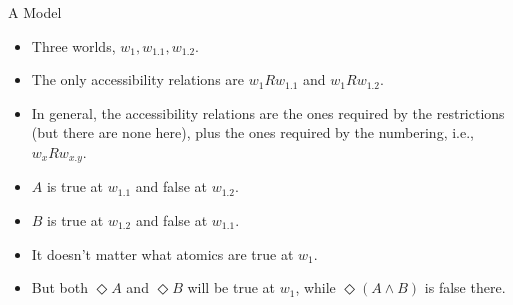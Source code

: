 \documentclass[
  ignorenonframetext,
]{beamer}
\providecommand{\tightlist}{%
  \setlength{\itemsep}{0pt}\setlength{\parskip}{0pt}}
\renewcommand{\,}{\text{, }}
\begin{document}
\begin{frame}{A Model}
\protect\hypertarget{a-model-1}{}

\begin{itemize}
\tightlist
\item
  Three worlds, \(w_1, w_{1.1}, w_{1.2}\).
\item
  The only accessibility relations are \(w_1Rw_{1.1}\) and
  \(w_1Rw_{1.2}\).
\item
  In general, the accessibility relations are the ones required by the
  restrictions (but there are none here), plus the ones required by the
  numbering, i.e., \(w_xRw_{x.y}\).
\item
  \(A\) is true at \(w_{1.1}\) and false at \(w_{1.2}\).
\item
  \(B\) is true at \(w_{1.2}\) and false at \(w_{1.1}\).
\item
  It doesn't matter what atomics are true at \(w_1\).
\item
  But both \(\Diamond A\) and \(\Diamond B\) will be true at \(w_1\),
  while \(\Diamond (A \wedge B)\) is false there.
\end{itemize}

\end{frame}
\end{document}

